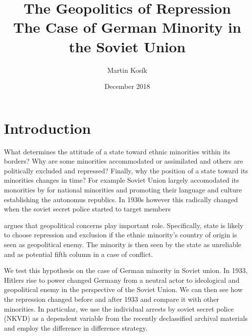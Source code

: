 \documentclass[12pt]{article}
\title{The Geopolitics of Repression \\
  \large The Case of German Minority in the Soviet Union}
\author{Martin Kosík}
\date{December 2018}
\begin{document}
\maketitle


\section{Introduction}
What determines the attitude of a state toward ethnic minorities within its borders? Why are some minorities accommodated or assimilated and others are politically excluded and repressed? Finally, why the position of a state toward its minorities changes in time? For example Soviet Union largely accomodated its monorities by  for national minorities and promoting their language and culture establishing the autonomus republics. In 1930s however this radically changed when the soviet secret police started to target members

\citet{mylonas_politics_2013} argues that geopolitical concerns play important role. Specifically, state is likely to choose repression and exclusion if the ethnic minority's country of origin is seen as geopolitical enemy. The minority is then seen by the state as unreliable and  as potential fifth column in a case of conflict.  

We test this hypothesis on the case of German minority in Soviet union.
In 1933, Hitlers rise to power changed Germany from a neutral actor to ideological and geopolitical enemy in the perspective of the Soviet Union. We can then see how the repression changed before and after 1933 and compare it with other minorities. In particular, we use the individual arrests by soviet secret police (NKVD) as a dependent variable from the recently declassified archival materials and employ the difference in difference strategy. 

\end{document}
